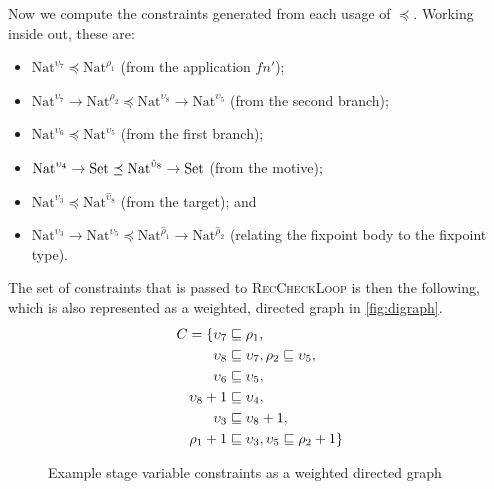 \documentclass[nonacm,screen,10pt]{acmart}
\begin{document}
Now we compute the constraints generated from each usage of $\preceq$. Working inside out, these are:
\begin{itemize}
    \item $\text{Nat}^{\upsilon_7} \preceq \text{Nat}^{\rho_1}$ (from the application $f n'$);
    \item $\text{Nat}^{\upsilon_7} \to \text{Nat}^{\rho_2} \preceq \text{Nat}^{\upsilon_8} \to \text{Nat}^{\upsilon_5}$ (from the second branch);
    \item $\text{Nat}^{\upsilon_6} \preceq \text{Nat}^{\upsilon_5}$ (from the first branch);
    \item $\text{Nat}^{\upsilon_4} \to \text{Set} \preceq \text{Nat}^{\hat{\upsilon}_8} \to \text{Set}$ (from the motive);
    \item $\text{Nat}^{\upsilon_3} \preceq \text{Nat}^{\hat{\upsilon}_8}$ (from the target); and
    \item $\text{Nat}^{\upsilon_3} \to \text{Nat}^{\upsilon_5} \preceq \text{Nat}^{\hat{\rho}_1} \to \text{Nat}^{\hat{\rho}_2}$ (relating the fixpoint body to the fixpoint type).
\end{itemize}

The set of constraints that is passed to \textsc{RecCheckLoop} is then the following, which is also represented as a weighted, directed graph in \autoref{fig:digraph}.
\begin{align*}
    C = \{\upsilon_7 &\sqsubseteq \rho_1, \\
    \upsilon_8 &\sqsubseteq \upsilon_7, \rho_2 \sqsubseteq \upsilon_5, \\
    \upsilon_6 &\sqsubseteq \upsilon_5, \\
    \upsilon_8+1 &\sqsubseteq \upsilon_4, \\
    \upsilon_3 &\sqsubseteq \upsilon_8+1, \\
    \rho_1+1 &\sqsubseteq \upsilon_3, \upsilon_5 \sqsubseteq \rho_2+1\}
\end{align*}

\begin{figure}
    \centering
{}
\caption{Example stage variable constraints as a weighted directed graph}
\label{fig:digraph}
\end{figure}
\end{document}
